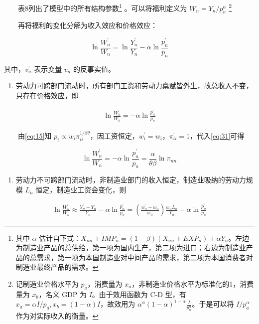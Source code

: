 \documentclass[
]{article}
\providecommand{\tightlist}{%
  \setlength{\itemsep}{0pt}\setlength{\parskip}{0pt}}
\begin{document}
　　表8列出了模型中的所有结构参数\footnote{其中 \(\alpha\) 估计自下式：\(X_{n n}+I M P_{n}=(1-\beta)\left(X_{n n}+E X P_{n}\right)+\alpha Y_{n}\)。左边为制造业产品的总供给，第一项为国内生产，第二项为进口；右边为制造业产品的总需求，第一项为本国制造业对中间产品的需求，第二项为本国消费者对制造业最终产品的需求。} 。可以将福利定义为 \(W_n = Y_n/{p_n^\alpha}\) \footnote{记制造业价格水平为 \(p_a\)，消费量为 \(x_a\)，非制造业价格水平为标准化的1，消费量为 \(x_b\)，名义 GDP 为 \(I\)。由于效用函数为 C-D 型，有 \(x_a = \alpha I/p_a, x_b = (1-\alpha)I\)，故效用为 \(\alpha^{\alpha}(1-\alpha)^{1-\alpha} \frac{I}{p_a^{\alpha}}\)。于是可以将 \(I/{p_a^\alpha}\) 作为对实际收入的衡量。}

　　再将福利的变化分解为收入效应和价格效应：

\[
\ln \frac{W_{n}^{\prime}}{W_{n}}=\ln \frac{Y_{n}^{\prime}}{Y_{n}}-\alpha \ln \frac{p_{n}^{\prime}}{p_{n}} 
\]

其中，\(v_n^{\prime}\) 表示变量 \(v_n\) 的反事实值。

\begin{enumerate}
\def\labelenumi{\arabic{enumi}.}
\tightlist
\item
  劳动力可跨部门流动时，所有部门工资和劳动力禀赋皆外生，故总收入不变，只存在价格效应，即
\end{enumerate}

\begin{align}
\ln \frac{W_{n}^{\prime}}{W_{n}}=-\alpha \ln \frac{p_{n}^{\prime}}{p_{n}} \label{eq:31}
\end{align}

　　由\eqref{eq:15}知 \(p_i \propto w_i \pi_{ii}^{1/{\beta \theta}}\)，因工资恒定，\(w_i^{\prime} = w_i\)，\(\pi_{ii}^{\prime}=1\)，代入\eqref{eq:31}可得

\[
\ln \frac{W_{n}^{\prime}}{W_{n}}=-\alpha \ln \frac{p_{n}^{\prime}}{p_{n}} =\frac{\alpha}{\theta \beta} \ln \pi_{nn}
\]

\begin{enumerate}
\def\labelenumi{\arabic{enumi}.}
\setcounter{enumi}{1}
\tightlist
\item
  劳动力不可跨部门流动时，非制造业部门的收入恒定，制造业吸纳的劳动力规模 \(L_n\) 恒定，制造业工资会变化，则
\end{enumerate}

\begin{align}
\ln \frac{W_{n}^{\prime}}{W_{n}} \approx \frac{Y_{n}^{\prime}-Y_{n}}{Y_{n}}-\alpha \ln \frac{p_{n}^{\prime}}{p_{n}} =\left(\frac{w_{n}^{\prime}-w_{n}}{w_{n}}\right) \frac{w_{n} L_{n}}{Y_{n}}-\alpha \ln \frac{p_{n}^{\prime}}{p_{n}} \label{eq:32}
\end{align}
\end{document}
